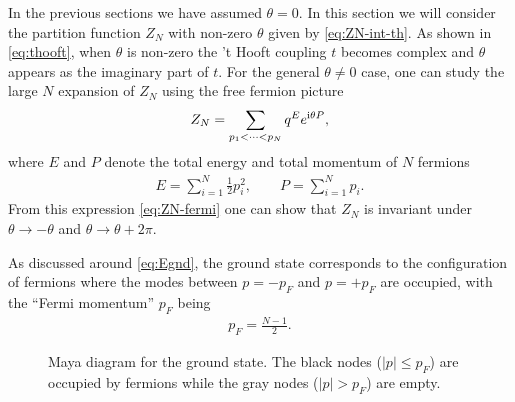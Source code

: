 \documentclass[11pt]{article}
\newcommand{\ri}{{\rm i}}
\def\th{\theta}
\newcommand{\hf}{\frac{1}{2}}
\renewcommand{\[}{\begin{eqnarray}}
\renewcommand{\]}{\end{eqnarray}}
\begin{document}
In the previous sections we have assumed $\th=0$.
In this section we will consider the partition function $Z_N$ with non-zero $\th$
given by \eqref{eq:ZN-int-th}.
As shown in \eqref{eq:thooft}, when $\th$ is non-zero
the 't Hooft coupling $t$ becomes complex and  
$\th$ appears as the imaginary part of $t$.
For the general $\th\ne0$ case,
one can study the large $N$ expansion of $Z_N$ 
using the free fermion picture 
\begin{equation}
\begin{aligned}
 Z_N=\sum_{p_1<\cdots <p_N} q^{E}e^{\ri\th P},
\end{aligned} 
\label{eq:ZN-fermi}
\end{equation}
where $E$ and $P$ denote the total energy and total momentum of $N$ fermions
\begin{equation}
\begin{aligned}
 E=\sum_{i=1}^N\hf p_i^2,\qquad
P=\sum_{i=1}^N p_i.
\end{aligned} 
\end{equation}
From this expression \eqref{eq:ZN-fermi} one can show that 
$Z_N$ is invariant under $\th\to-\th$ and $\th\to\th+2\pi$.

As discussed around \eqref{eq:Egnd}, the ground state corresponds to
the configuration of fermions where the modes between $p=-p_F$ and $p=+p_F$ are occupied,
with the ``Fermi momentum'' $p_F$ being
\begin{equation}
\begin{aligned}
 p_F=\frac{N-1}{2}.
\end{aligned} 
\end{equation}

\begin{figure}[t]
\centering
\hskip10mm
\caption{Maya diagram for the ground state.
The black nodes ($|p|\leq p_F$) are occupied 
by fermions while the gray nodes ($|p|>p_F$) are empty.} 
\label{fig:gnd}
\end{figure}
\end{document}
